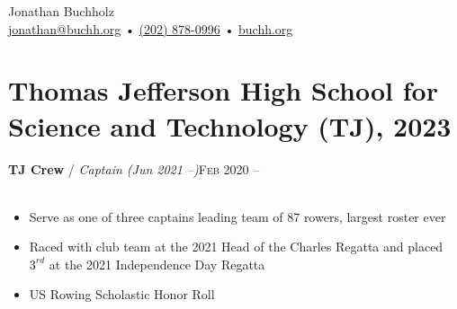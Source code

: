 \documentclass[12pt, a4paper]{article}
\begin{document}
{\LARGE Jonathan Buchholz}\\
\href{mailto:jonathan@buchh.org}{jonathan@buchh.org} • \href{tel:2028780996}{(202) 878-0996} • \href{https://buchh.org}{buchh.org}\\


\vspace{-12mm}
\section*{Thomas Jefferson High School for Science and Technology (TJ), 2023}





\vspace{-2mm}
\textbf{TJ Crew} / \textit{Captain (Jun 2021 --)}\hfill\textsc{Feb 2020 --}\\\
\begin{itemize}
    \vspace{-8mm}
    \item Serve as one of three captains leading team of 87 rowers, largest roster ever
    \item Raced with club team at the 2021 Head of the Charles Regatta and placed $3^{rd}$ at the 2021 Independence Day Regatta
    \item US Rowing Scholastic Honor Roll
\end{itemize}
\end{document}
